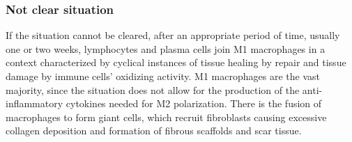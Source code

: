 		\subsubsection{Not clear situation}
		If the situation cannot be cleared, after an appropriate period of time, usually one or two weeks, lymphocytes and plasma cells join M1 macrophages in a context characterized by cyclical instances of tissue healing by repair and tissue damage by immune cells’ oxidizing activity.
		M1 macrophages are the vast majority, since the situation does not allow for the production of the anti-inflammatory cytokines needed for M2 polarization.
		There is the fusion of macrophages to form giant cells, which recruit fibroblasts causing excessive collagen deposition and formation of fibrous scaffolds and scar tissue.
